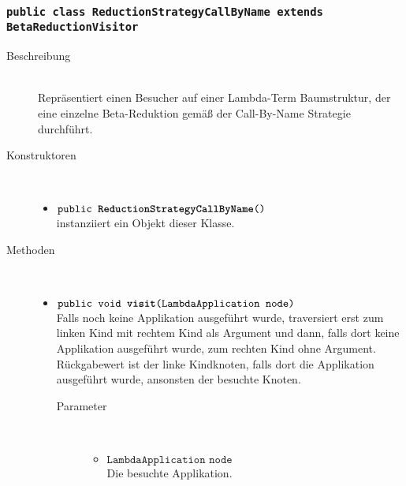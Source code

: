 \subsubsection{\normalfont \texttt{public class \textbf{ReductionStrategyCallByName} extends BetaReductionVisitor}}

\begin{description}
\item[Beschreibung] \hfill \\ Repräsentiert einen Besucher auf einer Lambda-Term Baumstruktur, der eine einzelne Beta-Reduktion gemäß der Call-By-Name Strategie durchführt.

\item[Konstruktoren] \hfill \\
	\vspace{-.8cm}
	\begin{itemize}
		\item $\texttt{public \textbf{ReductionStrategyCallByName}()}$ \\ instanziiert ein Objekt dieser Klasse.
	\end{itemize}

\item[Methoden] \hfill \\
	\vspace{-.8cm}
	\begin{itemize}
		\item $\texttt{public void \textbf{visit}(LambdaApplication node)}$ \\ Falls noch keine Applikation ausgeführt wurde, traversiert erst zum linken Kind mit rechtem Kind als Argument und dann, falls dort keine Applikation ausgeführt wurde, zum rechten Kind ohne Argument. Rückgabewert ist der linke Kindknoten, falls dort die Applikation ausgeführt wurde, ansonsten der besuchte Knoten.
		\begin{description}
			\item[Parameter] \hfill \\
			\vspace{-.8cm}
			\begin{itemize}
				\item $\texttt{LambdaApplication node}$ \\ Die besuchte Applikation.
			\end{itemize}
		\end{description}
		

\end{itemize}
\end{description}
